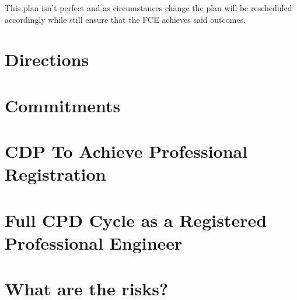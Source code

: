 \documentclass[11pt,a4paper]{article}
\begin{document}
		This plan isn't perfect and as circumstances change the plan will be rescheduled accordingly while still ensure that the FCE achieves said outcomes.
		
	\section{Directions}
		
		
	
	\section{Commitments}
	
	
	\section{CDP To Achieve Professional Registration}
	
	
	\section{Full CPD Cycle as a Registered Professional Engineer}
	
	\section{What are the risks?}
				
\end{document}
